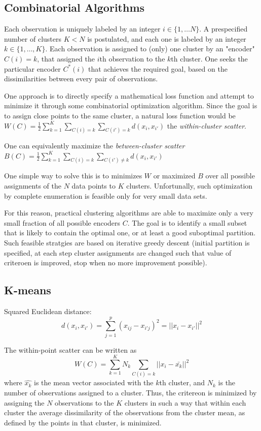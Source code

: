 \subsection*{Combinatorial Algorithms}
Each observation is uniquely labeled by an integer \(i \in \{1, \dots N\}\). A prespecified number of clusters \(K<N\) is postulated, and each one is labeled by an integer \(k \in \{1, \dots, K\}\). Each observation is assigned to (only) one cluster by an "encoder" \(C(i) = k\), that assigned the \(i\)th observation to the \(k\)th cluster. One seeks the particular encoder \(C^*(i)\) that achieves the required goal, based on the dissimilarities between every pair of observations.

One approach is to directly specify a mathematical loss function and attempt to minimize it through some combinatorial optimization algorithm. Since the goal is to assign close points to the same cluster, a natural loss function would be
$W(C) = \frac{1}{2} \sum_{k=1}^K \sum_{C(i)=k}\sum_{C(i')=k} d(x_i, x_{i'})$ the \textit{within-cluster scatter}.

One can equivalently maximize the \textit{between-cluster scatter} $B(C) = \frac{1}{2} \sum_{k=1}^K \sum_{C(i)=k}\sum_{C(i') \neq k} d(x_i, x_{i'})$

One simple way to solve this is to minimizes \(W\) or maximized \(B\) over all possible assignments of the \(N\) data points to \(K\) clusters. Unfortunally, such optimization by complete enumeration is feasible only for very small data sets.

For this reason, practical clustering algorithms are able to maximize only a very small fraction of all possible encoders \(C\). The goal is to identify a small subset that is likely to contain the optimal one, or at least a good suboptimal partition. Such feasible stratgies are based on iterative greedy descent (initial partition is specified, at each step cluster assignments are changed such that value of criteroen is improved, stop when no more improvement possible).

\subsection*{K-means}
Squared Euclidean distance:
\begin{equation*}
	d(x_i, x_{i'}) = \sum_{j=1}^p (x_{ij} - x_{i'j})^2 = ||x_i - x_{i'}||^2
\end{equation*}

The within-point scatter can be written as
\begin{equation*}
	W(C) = \sum_{k=1}^K N_k \sum_{C(i) = k} ||x_i - \bar{x_k}||^2
\end{equation*}
where \(\hat{x_k}\) is the mean vector associated with the \(k\)th cluster, and \(N_k\) is the number of observations assigned to a cluster. Thus, the critereon is minimized by assigning the \(N\) observations to the \(K\) clusters in such a way that within each cluster the average dissimilarity of the observations from the cluster mean, as defined by the points in that cluster, is minimized.

